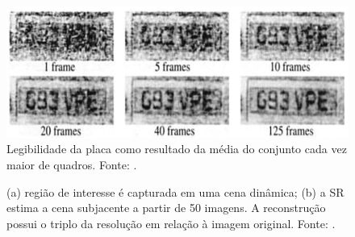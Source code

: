 \clearpage
\begin{figure}[h]
	\centering
	\includegraphics[scale=0.45]{figuras/SR_img_2.png}
	\caption{Legibilidade da placa como resultado da média do conjunto cada vez maior de quadros. Fonte: \cite{kang2000digital}.} 
	\label{fig:SR_2}
\end{figure}

\begin{figure}[h]
    \centering
    \qquad
    \caption{(a)  região de interesse é capturada em uma cena dinâmica; (b) a SR estima a cena subjacente a partir de 50 imagens. A reconstrução possui o triplo da resolução em relação à imagem original. Fonte: \cite{kang2000digital}. }%
	    \label{fig:SR_3}
\end{figure}

